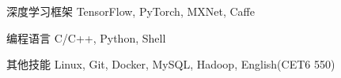 

\begin{cvskills}

  \cvskill
    {深度学习框架} %
    {TensorFlow, PyTorch, MXNet, Caffe} %

  \cvskill
    {编程语言} %
    {C/C++, Python, Shell} %

  \cvskill
    {其他技能} %
    {Linux, Git, Docker, MySQL, Hadoop, English(CET6 550)} %

\end{cvskills}
